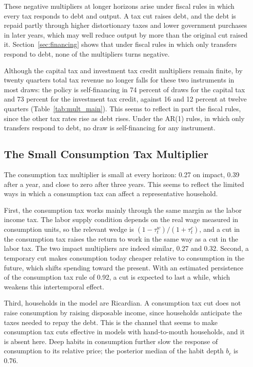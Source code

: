 \documentclass[article,11pt,letterpaper,fleqn]{article}
\theoremstyle{definition}
\numberwithin{equation}{section}
\begin{document}
These negative multipliers at longer horizons arise under fiscal rules in which every tax responds to debt and output. A tax cut raises debt, and the debt is repaid partly through higher distortionary taxes and lower government purchases in later years, which may well reduce output by more than the original cut raised it. Section~\ref{sec:financing} shows that under fiscal rules in which only transfers respond to debt, none of the multipliers turns negative.

Although the capital tax and investment tax credit multipliers remain finite, by twenty quarters total tax revenue no longer falls for these two instruments in most draws: the policy is self-financing in 74 percent of draws for the capital tax and 73 percent for the investment tax credit, against 16 and 12 percent at twelve quarters (Table~\ref{tab:mult_main}). This seems to reflect in part the fiscal rules, since the other tax rates rise as debt rises. Under the AR(1) rules, in which only transfers respond to debt, no draw is self-financing for any instrument.

\subsection{The Small Consumption Tax Multiplier}
\label{sec:small_ctax}

The consumption tax multiplier is small at every horizon: 0.27 on impact, 0.39 after a year, and close to zero after three years. This seems to reflect the limited ways in which a consumption tax can affect a representative household.

First, the consumption tax works mainly through the same margin as the labor income tax. The labor supply condition depends on the real wage measured in consumption units, so the relevant wedge is $(1-\tau_t^w)/(1+\tau_t^c)$, and a cut in the consumption tax raises the return to work in the same way as a cut in the labor tax. The two impact multipliers are indeed similar, 0.27 and 0.32. Second, a temporary cut makes consumption today cheaper relative to consumption in the future, which shifts spending toward the present. With an estimated persistence of the consumption tax rule of 0.92, a cut is expected to last a while, which weakens this intertemporal effect.

Third, households in the model are Ricardian. A consumption tax cut does not raise consumption by raising disposable income, since households anticipate the taxes needed to repay the debt. This is the channel that seems to make consumption tax cuts effective in models with hand-to-mouth households, and it is absent here. Deep habits in consumption further slow the response of consumption to its relative price; the posterior median of the habit depth $b_c$ is 0.76.
\end{document}
